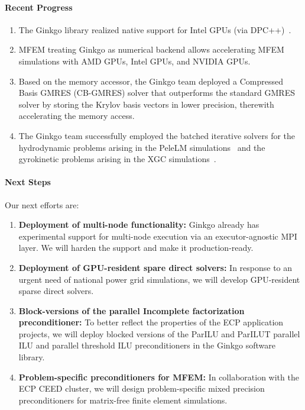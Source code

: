 \paragraph{Recent Progress}
\begin{enumerate}
\item 
The Ginkgo library realized native support for Intel GPUs (via DPC++)~\cite{portingintel}.
\item 
MFEM treating Ginkgo as numerical backend allows accelerating MFEM simulations with AMD GPUs, Intel GPUs, and NVIDIA GPUs.
\item
Based on the memory accessor, the Ginkgo team deployed a Compressed Basis GMRES (CB-GMRES) solver that outperforms the standard GMRES solver by storing the Krylov basis vectors in lower precision, 
therewith accelerating the memory access.
\item 
The Ginkgo team successfully employed the batched iterative solvers for the 
hydrodynamic problems arising in the PeleLM simulations~\cite{scala21} and the gyrokinetic problems arising in the 
XGC simulations~\cite{ipdps22}.
\end{enumerate}


\paragraph{Next Steps}


Our next efforts are:
\begin{enumerate}
	\item \textbf{Deployment of multi-node functionality:} 
	Ginkgo already has experimental support for multi-node execution via an executor-agnostic MPI layer. 
	We will harden the support and make it production-ready.
	\item \textbf{Deployment of GPU-resident spare direct solvers:} 
	In response to an urgent need of national power grid simulations, 
	we will develop GPU-resident sparse direct solvers.
	\item \textbf{Block-versions of the parallel Incomplete factorization 
	preconditioner:} To better reflect the properties of the ECP application 
	projects, we will deploy blocked versions of the ParILU and ParILUT 
	parallel ILU and parallel threshold ILU preconditioners in the Ginkgo 
	software library.
	\item \textbf{Problem-specific preconditioners for MFEM:} In collaboration 
	with the ECP CEED cluster, we will design problem-specific mixed precision 
	preconditioners for matrix-free finite element simulations.
\end{enumerate}
